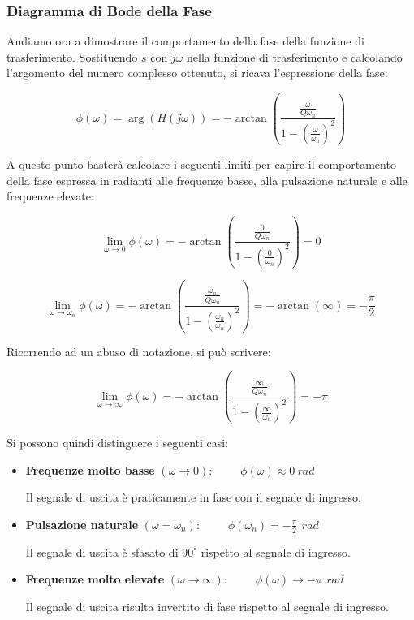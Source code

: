 \subsubsection{Diagramma di Bode della Fase}

Andiamo ora a dimostrare il comportamento della fase della funzione di trasferimento. 
Sostituendo $s$ con $j\omega$ nella funzione di trasferimento e calcolando l'argomento del numero complesso ottenuto, si ricava l'espressione della fase:

\begin{equation}
\phi(\omega) = \arg\left(H(j\omega)\right) =
-\arctan\left(\frac{\frac{\omega}{Q\omega_n}}{1-\left(\frac{\omega}{\omega_n}\right)^2}\right)
\label{eq: Fase jw LP}
\end{equation}

A questo punto basterà calcolare i seguenti limiti per capire il comportamento della fase espressa in radianti alle frequenze basse, alla pulsazione naturale e alle frequenze elevate:

\begin{equation}
\lim_{\omega \to 0} \phi(\omega) =
-\arctan\left(\frac{\frac{0}{Q\omega_n}}{1-\left(\frac{0}{\omega_n}\right)^2}\right)= 0
\label{eq: Fase w 0 LP}
\end{equation}

\begin{equation}
\lim_{\omega \to \omega_n} \phi(\omega) =
-\arctan\left(\frac{\frac{\omega_n}{Q\omega_n}}{1-\left(\frac{\omega_n}{\omega_n}\right)^2}\right) = -\arctan(\infty) = -\frac{\pi}{2}
\label{eq: Fase w wn LP}
\end{equation}

Ricorrendo ad un abuso di notazione, si può scrivere:

\begin{equation}
\lim_{\omega \to \infty} \phi(\omega) =
-\arctan\left(\frac{\frac{\infty}{Q\omega_n}}{1-\left(\frac{\infty}{\omega_n}\right)^2}\right) = -\pi
\label{eq: Fase w infty LP}
\end{equation}

Si possono quindi distinguere i seguenti casi:

\begin{itemize}

\item \textbf{Frequenze molto basse} $(\omega \to 0):\qquad$
\(
\phi(\omega) \approx \SI{0}{rad}
\)

Il segnale di uscita è praticamente in fase con il segnale di ingresso.

\item \textbf{Pulsazione naturale} $(\omega = \omega_n):\qquad$
\(
\phi(\omega_n) = -\frac{\pi}{2}\,\SI{}{rad}
\)

Il segnale di uscita è sfasato di $90^\circ$ rispetto al segnale di ingresso.

\item \textbf{Frequenze molto elevate} $(\omega \to \infty):\qquad$
\(
\phi(\omega) \to -\pi\,\SI{}{rad}
\)

Il segnale di uscita risulta invertito di fase rispetto al segnale di ingresso.

\end{itemize}

